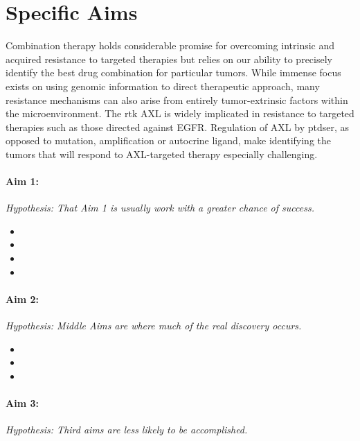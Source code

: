 



\section{Specific Aims}

Combination therapy holds considerable promise for overcoming intrinsic and acquired resistance to targeted therapies but relies on our ability to precisely identify the best drug combination for particular tumors. While immense focus exists on using genomic information to direct therapeutic approach, many resistance mechanisms can also arise from entirely tumor-extrinsic factors within the microenvironment. The \gls{rtk} AXL is widely implicated in resistance to targeted therapies such as those directed against EGFR. Regulation of AXL by \gls{ptdser}, as opposed to mutation, amplification or autocrine ligand, make identifying the tumors that will respond to AXL-targeted therapy especially challenging\cite{Rachez2000}.

\paragraph*{Aim 1: \SpecificAimOne} \emph{Hypothesis: That Aim 1 is usually work with a greater chance of success.}

\begin{itemize}[noitemsep]
	\item \SpecificAimOneA
	\item \SpecificAimOneB
	\item \SpecificAimOneC
	\item \SpecificAimOneD
\end{itemize}

\paragraph*{Aim 2: \SpecificAimTwo} \emph{Hypothesis: Middle Aims are where much of the real discovery occurs.}

\begin{itemize}[noitemsep]
	\item \SpecificAimTwoA
	\item \SpecificAimTwoB
	\item \SpecificAimTwoC
\end{itemize}

\paragraph*{Aim 3: \SpecificAimThree} \emph{Hypothesis: Third aims are less likely to be accomplished.}

